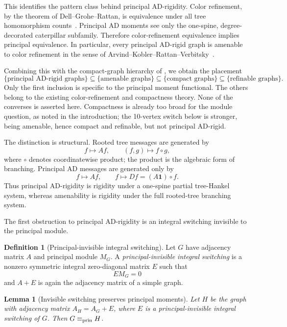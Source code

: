 \documentclass[a4paper,fleqn]{cas-sc}
\newtheorem{lemma}[theorem]{Lemma}
\theoremstyle{definition}
\newtheorem{definition}[theorem]{Definition}
\theoremstyle{remark}
\newcommand{\one}{\mathbf 1}
\begin{document}
This identifies the pattern class behind principal AD-rigidity.  Color
refinement, by the theorem of Dell--Grohe--Rattan, is equivalence under all tree
homomorphism counts~\cite{DellGroheRattan2018}.  Principal AD moments see only the
one-spine, degree-decorated caterpillar subfamily.  Therefore color-refinement
equivalence implies principal equivalence.  In particular, every principal
AD-rigid graph is amenable to color refinement in the sense of
Arvind--Kobler--Rattan--Verbitsky~\cite{ArvindKoblerRattanVerbitsky2017}.

Combining this with the compact-graph hierarchy of
\citet{ArvindKoblerRattanVerbitsky2017}, we obtain the placement
\[
        \{\text{principal AD-rigid graphs}\}
        \subseteq \{\text{amenable graphs}\}
        \subseteq \{\text{compact graphs}\}
        \subseteq \{\text{refinable graphs}\}.
\]
Only the first inclusion is specific to the principal moment functional.  The
others belong to the existing color-refinement and compactness theory.  None of
the converses is asserted here.  Compactness is already too broad for the module
question, as noted in the introduction; the 10-vertex switch below is stronger,
being amenable, hence compact and refinable, but not principal AD-rigid.

The distinction is structural.  Rooted tree messages are generated by
\[
        f\mapsto Af,
        \qquad
        (f,g)\mapsto f\circ g,
\]
where $\circ$ denotes coordinatewise product; the product is the algebraic form
of branching.  Principal AD messages are generated only by
\[
        f\mapsto Af,
        \qquad
        f\mapsto Df=(A\one)\circ f.
\]
Thus principal AD-rigidity is rigidity under a one-spine partial tree-Hankel
system, whereas amenability is rigidity under the full rooted-tree branching
system.

The first obstruction to principal AD-rigidity is an integral switching invisible
to the principal module.

\begin{definition}[Principal-invisible integral switching]
Let $G$ have adjacency matrix $A$ and principal module $M_G$.  A
\emph{principal-invisible integral switching} is a nonzero symmetric integral
zero-diagonal matrix $E$ such that
\[
        EM_G=0
\]
and $A+E$ is again the adjacency matrix of a simple graph.
\end{definition}

\begin{lemma}[Invisible switching preserves principal moments]
\label{lem:invisible-switching}
Let $H$ be the graph with adjacency matrix $A_H=A_G+E$, where $E$ is a
principal-invisible integral switching of $G$.  Then $G\equiv_{\rm prin}H$.
\end{lemma}
\end{document}
